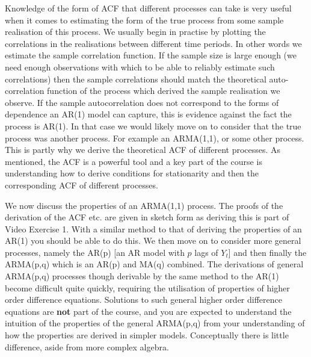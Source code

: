 \documentclass[openany]{tufte-book} %
\begin{document}
    Knowledge of the form of ACF that different processes can take  is very useful when it comes to estimating the form of the true process from some sample realisation of this process. We usually begin in practise by plotting the correlations in the realisations between different time periods. In other words we estimate the sample correlation function. If the sample size is large enough (we need enough observations with which to be able to reliably estimate such correlations) then the sample correlations should match the theoretical auto-correlation function of the process which derived the sample realisation we observe. If the sample autocorrelation does not correspond to the forms of dependence an AR(1) model can capture, this is evidence against the fact the process is AR(1). In that case we would likely move on to consider that the true process was another process. For example an ARMA(1,1), or some other process. This is partly why we derive the theoretical ACF of different processes. As mentioned, the ACF is  a powerful tool and a key part of the course is understanding how to derive conditions for stationarity and then the corresponding ACF of different processes.

We now discuss the properties of an ARMA(1,1) process. The proofs of the derivation of the ACF etc. are given in sketch form as deriving this is part of  Video Exercise 1. With a similar method to that of deriving the properties of an AR(1) you should be able to do this. We then move on to consider more general processes, namely the AR(p) [an AR model with $p$ lags of $Y_{t}$] and then finally the ARMA(p,q) which is an AR(p) and MA(q) combined. The derivations of general ARMA(p,q) processes though derivable by the same method to the AR(1) become difficult quite quickly, requiring the utilisation of properties of higher order difference equations. Solutions to such general higher order difference equations  are \textbf{not} part of the course, and you are expected to understand the intuition of the properties of the general ARMA(p,q) from your understanding of how the properties are derived in simpler models. Conceptually there is little difference, aside from more complex algebra.
\end{document}
